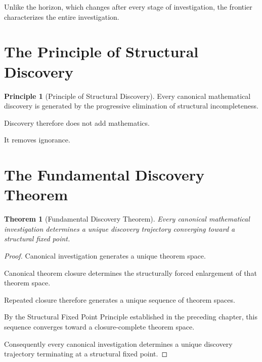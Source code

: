 \documentclass[13pt,openany]{book}
\theoremstyle{plain}
\newtheorem{theorem}{Theorem}[chapter]
\theoremstyle{definition}
\newtheorem{principle}{Principle}[chapter]
\begin{document}
Unlike the horizon, which changes after every stage of investigation, the
frontier characterizes the entire investigation.

\section{The Principle of Structural Discovery}

\begin{principle}[Principle of Structural Discovery]

Every canonical mathematical discovery is generated by the progressive
elimination of structural incompleteness.

\end{principle}

Discovery therefore does not add mathematics.

It removes ignorance.

\section{The Fundamental Discovery Theorem}

\begin{theorem}[Fundamental Discovery Theorem]

Every canonical mathematical investigation determines a unique discovery
trajectory converging toward a structural fixed point.

\end{theorem}

\begin{proof}

Canonical investigation generates a unique theorem space.

Canonical theorem closure determines the structurally forced enlargement of
that theorem space.

Repeated closure therefore generates a unique sequence of theorem spaces.

By the Structural Fixed Point Principle established in the preceding chapter,
this sequence converges toward a closure-complete theorem space.

Consequently every canonical investigation determines a unique discovery
trajectory terminating at a structural fixed point.

\end{proof}
\end{document}
